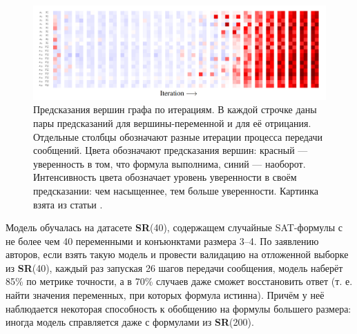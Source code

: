 \begin{figure}[ht]
\begin{center}
    \includegraphics[scale=0.24]{./assets/neurosat-voting.png}
    \caption{\label{neurosat-voting} Предсказания вершин графа по итерациям. В каждой строчке даны пары предсказаний для вершины-переменной и для её отрицания. Отдельные столбцы обозначают разные итерации процесса передачи сообщений. Цвета обозначают предсказания вершин: красный --- уверенность в том, что формула выполнима, синий --- наоборот. Интенсивность цвета обозначает уровень уверенности в своём предсказании: чем насыщеннее, тем больше уверенности. Картинка взята из статьи \cite{neurosat-paper}.}
\end{center}
\end{figure}

Модель обучалась на датасете \textbf{SR}(40), содержащем случайные SAT-формулы с не более чем 40 переменными и конъюнктами размера 3--4. По заявлению авторов, если взять такую модель и провести валидацию на отложенной выборке из \textbf{SR}(40), каждый раз запуская 26 шагов передачи сообщения, модель наберёт 85\% по метрике точности, а в 70\% случаев даже сможет восстановить ответ (т. е. найти значения переменных, при которых формула истинна). Причём у неё наблюдается некоторая способность к обобщению на формулы большего размера: иногда модель справляется даже с формулами из \textbf{SR}(200).

